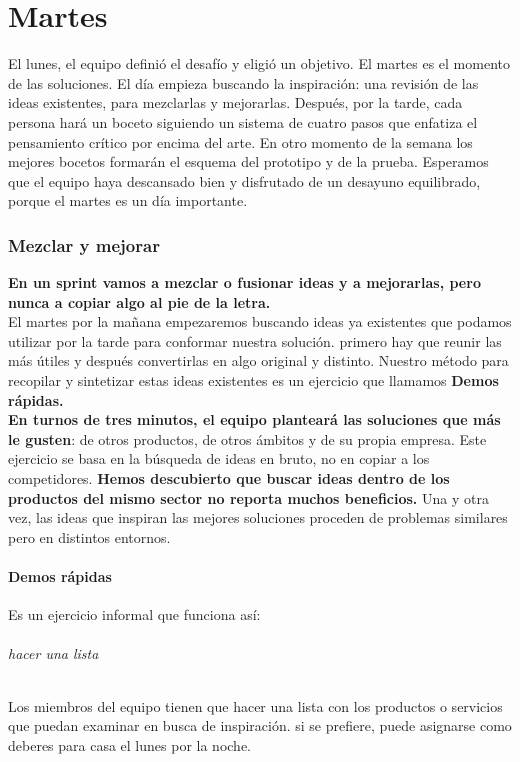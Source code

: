 \documentclass[10pt]{article}
\begin{document}
\part*{ \center Martes}
El lunes, el equipo definió el desafío y eligió un objetivo. El martes es el momento de las soluciones. El día empieza buscando la inspiración: una revisión de las ideas existentes, para mezclarlas y mejorarlas. Después, por la tarde, cada persona hará un boceto siguiendo un sistema de cuatro pasos que enfatiza el pensamiento crítico por encima del arte. En otro momento de la semana los mejores bocetos formarán el esquema del prototipo y de la prueba. Esperamos que el equipo haya descansado bien y disfrutado de un desayuno equilibrado, porque el martes es un día importante.
\begin{multicols}{2}
\section*{Mezclar y mejorar}
\textbf{En un sprint vamos a mezclar o fusionar ideas y a mejorarlas, pero nunca a copiar algo al pie de la letra.}\\
El martes por la mañana empezaremos buscando ideas ya existentes que podamos utilizar por la tarde para conformar nuestra solución. primero hay que reunir las más útiles y después convertirlas en algo original y distinto. Nuestro método para recopilar y sintetizar estas ideas existentes es un ejercicio que llamamos \textbf{Demos rápidas.} \\ 
\textbf{En turnos de tres minutos, el equipo planteará las soluciones que más le gusten}: de otros productos, de otros ámbitos y de su propia empresa. Este ejercicio se basa en la búsqueda de ideas en bruto, no en copiar a los competidores. \textbf{Hemos descubierto que buscar ideas dentro de los productos del mismo sector no reporta muchos beneficios.} Una y otra vez, las ideas que inspiran las  mejores soluciones proceden de problemas similares pero en distintos entornos. \\
\subsection*{Demos rápidas}
Es un ejercicio informal que funciona así:
\paragraph*{hacer una lista}  Los miembros del equipo tienen que hacer una lista con los productos o servicios que puedan examinar en busca de inspiración. si se prefiere, puede asignarse como deberes para casa el lunes por la noche.

\end{multicols}
\end{document}
